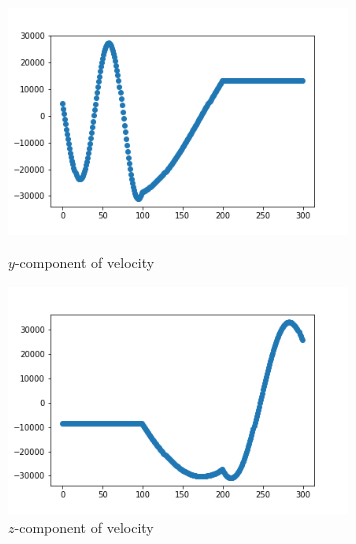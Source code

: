 \documentclass[12pt]{article}
\begin{document}
	\begin{figure}[H]
		\begin{multicols}{2}
			\includegraphics[width=\linewidth, height=6cm]{vsy3.png} \caption{$y$-component of velocity} \label{vsy3} \par
			\includegraphics[width=\linewidth, height=6cm]{vsz3.png} \caption{$z$-component of velocity} \label{vsz3} \par
		\end{multicols}
	\end{figure}
	
\end{document}
